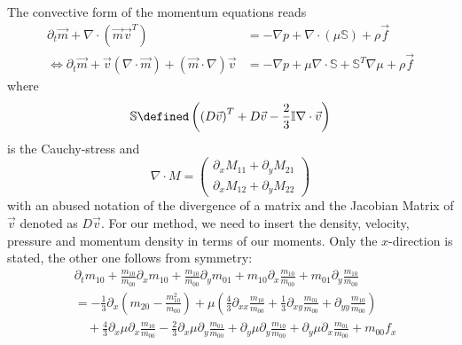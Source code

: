 
The convective form of the momentum equations reads
\begin{equation}
  \label{eq:compressible NS}
  \begin{aligned}
    \partial_t \vec{m} + \nabla \cdot (\vec{m}\vec{v}^T)
    &= - \nabla p + \nabla \cdot (\mu\mathbb{S}) + \rho \vec{f} \\
    \Leftrightarrow\partial_t \vec{m} + \vec{v}(\nabla \cdot \vec{m}) + (\vec{m} \cdot \nabla)\vec{v}
    &= - \nabla p + \mu \nabla \cdot \mathbb{S} + \mathbb{S}^T \nabla\mu + \rho \vec{f}
  \end{aligned}
\end{equation}
where
\begin{equation}
  \mathbb{S} \defined \left({(D\vec{v})}^T + D\vec{v} - \frac{2}{3}\mathbb{I}\nabla\cdot\vec{v} \right)
\end{equation}
is the Cauchy-stress and
\begin{equation}
  \nabla \cdot M =
  \begin{pmatrix}
    \partial_x M_{11} + \partial_y M_{21} \\
    \partial_x M_{12} + \partial_y M_{22}
  \end{pmatrix}
\end{equation}
with an abused notation of the divergence of a matrix and the Jacobian Matrix of $\vec{v}$ denoted as $D\vec{v}$.
For our method, we need to insert the density, velocity, pressure and momentum density in terms of our moments.
Only the $x$-direction is stated, the other one follows from symmetry:
\begin{equation}
  \begin{aligned}
    & \partial_t m_{10}
    + \frac{m_{10}}{m_{00}} \partial_x m_{10}
    + \frac{m_{10}}{m_{00}}\partial_y m_{01}
    + m_{10} \partial_x \frac{m_{10}}{m_{00}}
    + m_{01} \partial_y \frac{m_{10}}{m_{00}}
    \\
    & =
     - \frac{1}{3} \partial_x \left(m_{20} - \frac{ m_{10}^2 }{ m_{00} } \right)
     + \mu \left(\frac{4}{3}\partial_{xx}\frac{m_{10}}{m_{00}}
            + \frac{1}{3}\partial_{xy} \frac{m_{01}}{m_{00}}
            + \partial_{yy} \frac{m_{10}}{m_{00}} \right) \\
    &\quad + \frac{4}{3}\partial_x \mu \partial_x \frac{m_{10}}{m_{00}}
    - \frac{2}{3}\partial_x \mu \partial_y \frac{m_{01}}{m_{00}}
    + \partial_y \mu \partial_y \frac{m_{10}}{m_{00}}
    + \partial_y \mu \partial_x \frac{m_{01}}{m_{00}}
    + m_{00}f_x
  \end{aligned}
\end{equation}

